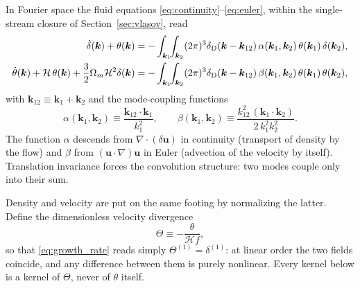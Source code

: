 \documentclass[a4paper,11pt]{article}
\newcommand{\vk}{\bm{k}}
\newcommand{\vu}{\bm{u}}
\def\cH{\mathcal{H}}
\def\dirac{\delta_{\rm D}}
\def\Om{\Omega_m}
\numberwithin{equation}{section}
\begin{document}
In Fourier space the fluid equations \eqref{eq:continuity}--\eqref{eq:euler}, within the single-stream closure of Section~\ref{sec:vlasov}, read \cite[Eqs.~(37)--(39)]{Bernardeau2002}
\begin{align}
\dot\delta(\vk) + \theta(\vk)
&= -\int_{\vk_1}\!\!\int_{\vk_2} (2\pi)^3\dirac(\vk-\vk_{12})\,
\alpha(\vk_1,\vk_2)\,\theta(\vk_1)\,\delta(\vk_2) ,
\label{eq:eom_delta}\\
\dot\theta(\vk) + \cH\,\theta(\vk) + \frac{3}{2}\Om\cH^2\delta(\vk)
&= -\int_{\vk_1}\!\!\int_{\vk_2} (2\pi)^3\dirac(\vk-\vk_{12})\,
\beta(\vk_1,\vk_2)\,\theta(\vk_1)\,\theta(\vk_2) ,
\label{eq:eom_theta}
\end{align}
with $\vk_{12} \equiv \vk_1 + \vk_2$ and the mode-coupling functions
\begin{equation}
\alpha(\vk_1,\vk_2) \equiv \frac{\vk_{12}\cdot\vk_1}{k_1^2},
\qquad
\beta(\vk_1,\vk_2) \equiv \frac{k_{12}^2\,(\vk_1\cdot\vk_2)}{2\,k_1^2k_2^2} .
\label{eq:alpha_beta}
\end{equation}
The function $\alpha$ descends from $\nabla\cdot(\delta\vu)$ in continuity (transport of density by the flow) and $\beta$ from $(\vu\cdot\nabla)\vu$ in Euler (advection of the velocity by itself). Translation invariance forces the convolution structure: two modes couple only into their sum.

Density and velocity are put on the same footing by normalizing the latter. Define the dimensionless velocity divergence
\begin{equation}
\Theta \equiv -\frac{\theta}{\cH f} ,
\label{eq:Theta_def}
\end{equation}
so that \eqref{eq:growth_rate} reads simply $\Theta^{(1)} = \delta^{(1)}$: at linear order the two fields coincide, and any difference between them is purely nonlinear. Every kernel below is a kernel of $\Theta$, never of $\theta$ itself.
\end{document}
